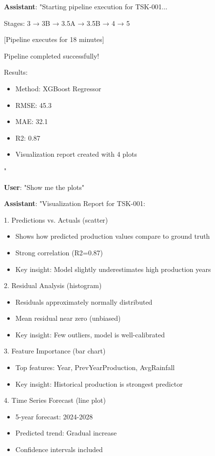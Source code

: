 \documentclass[11pt,a4paper]{article}
\begin{document}
\textbf{Assistant}: "Starting pipeline execution for TSK-001...

Stages: 3 → 3B → 3.5A → 3.5B → 4 → 5

[Pipeline executes for 18 minutes]

Pipeline completed successfully!

Results:
\begin{itemize}
    \item Method: XGBoost Regressor
    \item RMSE: 45.3
    \item MAE: 32.1
    \item R2: 0.87
    \item Visualization report created with 4 plots
\end{itemize}"

\textbf{User}: "Show me the plots"

\textbf{Assistant}: "Visualization Report for TSK-001:

1. Predictions vs. Actuals (scatter)
\begin{itemize}
    \item Shows how predicted production values compare to ground truth
    \item Strong correlation (R2=0.87)
    \item Key insight: Model slightly underestimates high production years
\end{itemize}

2. Residual Analysis (histogram)
\begin{itemize}
    \item Residuals approximately normally distributed
    \item Mean residual near zero (unbiased)
    \item Key insight: Few outliers, model is well-calibrated
\end{itemize}

3. Feature Importance (bar chart)
\begin{itemize}
    \item Top features: Year, PrevYearProduction, AvgRainfall
    \item Key insight: Historical production is strongest predictor
\end{itemize}

4. Time Series Forecast (line plot)
\begin{itemize}
    \item 5-year forecast: 2024-2028
    \item Predicted trend: Gradual increase
    \item Confidence intervals included
\end{itemize}
\end{document}
